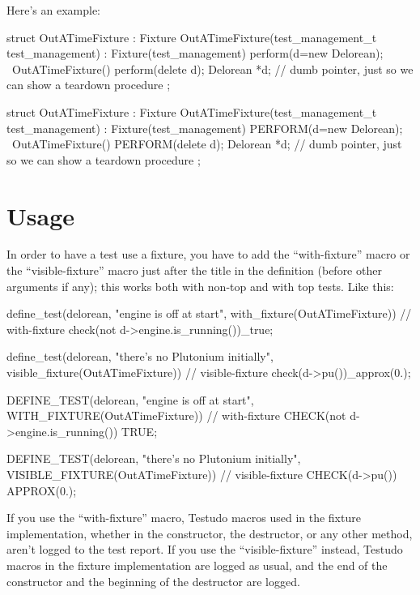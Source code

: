 \documentclass[twoside, a4paper, article]{memoir}
\begin{document}
Here's an example:
\begin{cpplisting}
struct OutATimeFixture : Fixture {
  OutATimeFixture(test_management_t test_management)
    : Fixture(test_management)
    { perform(d=new Delorean); }
  ~OutATimeFixture()
    { perform(delete d); }
  Delorean *d; // dumb pointer, just so we can show a teardown procedure
};
\end{cpplisting}

\begin{cpplisting}
struct OutATimeFixture : Fixture
{
  OutATimeFixture(test_management_t test_management)
    : Fixture(test_management)
  {
    PERFORM(d=new Delorean);
  }
  ~OutATimeFixture()
  {
    PERFORM(delete d);
  }
  Delorean *d; // dumb pointer, just so we can show a teardown procedure
};
\end{cpplisting}

\section{Usage}
\label{sec:fixture-usage}

In order to have a test use a fixture, you have to add the ``with-fixture''
macro or the ``visible-fixture'' macro just after the title in the definition
(before other arguments if any); this works both with non-top and with top
tests.  Like this:
\begin{cpplisting}
define_test(delorean,
            "engine is off at start",
            with_fixture(OutATimeFixture)) // with-fixture
{
  check(not d->engine.is_running())_true;
}

define_test(delorean,
            "there's no Plutonium initially",
            visible_fixture(OutATimeFixture)) // visible-fixture
{
  check(d->pu())_approx(0.);
}
\end{cpplisting}

\begin{cpplisting}
DEFINE_TEST(delorean,
            "engine is off at start",
            WITH_FIXTURE(OutATimeFixture)) // with-fixture
{
  CHECK(not d->engine.is_running()) TRUE;
}

DEFINE_TEST(delorean,
            "there's no Plutonium initially",
            VISIBLE_FIXTURE(OutATimeFixture)) // visible-fixture
{
  CHECK(d->pu()) APPROX(0.);
}
\end{cpplisting}

If you use the ``with-fixture'' macro, Testudo macros used in the fixture
implementation, whether in the constructor, the destructor, or any other
method, aren't logged to the test report.  If you use the ``visible-fixture''
instead, Testudo macros in the fixture implementation are logged as usual, and
the end of the constructor and the beginning of the destructor are logged.
\end{document}
